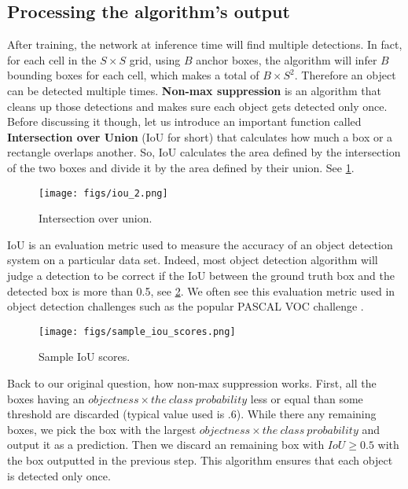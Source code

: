 \subsection{Processing the algorithm's output}\label{IOU}

After training, the network at inference time will find multiple detections. In fact, for each cell in the $S \times S$ grid, using $B$ anchor
boxes, the algorithm will infer $B$ bounding boxes for each cell, which makes a total of $B \times S^2$. Therefore an object can be detected
multiple times.  \textbf{Non-max suppression} is an algorithm that cleans up those detections and makes sure each object gets detected only once.
Before discussing it though, let us introduce an important function called \textbf{Intersection over Union} (IoU for short) that calculates how much
a box or a rectangle overlaps another. So, IoU calculates the area defined by the intersection of the two boxes and divide it by the area defined by
their union. See \cref{fig:iou}.

\begin{figure}[!htbp]
  \centering
  \texttt{[image: figs/iou\_2.png]}
  \caption{Intersection over union.}\label{fig:iou}
\end{figure}

IoU is an evaluation metric used to measure the accuracy of an object detection system on a particular data set. Indeed, most object detection
algorithm will judge a detection to be correct if the IoU between the ground truth box and the detected box is more than 0.5, see
\cref{fig:iou_sample}. We often see this evaluation metric used in object detection challenges such as the popular PASCAL VOC challenge \cite{pascal}. \\

\begin{figure}[!htbp]
  \centering
  \texttt{[image: figs/sample\_iou\_scores.png]}
  \caption{Sample IoU scores.}\label{fig:iou_sample}
\end{figure}

Back to our original question, how non-max suppression works. First, all the boxes having an $objectness \times the\ class\ probability$ less or
equal than some threshold are discarded (typical value used is .6). While there any remaining boxes, we pick the box with the largest $objectness
\times the\ class\ probability$ and output it as a prediction. Then we discard an remaining box with $IoU \geq 0.5$ with the box outputted in the
previous step. This algorithm ensures that each object is detected only once. \\

